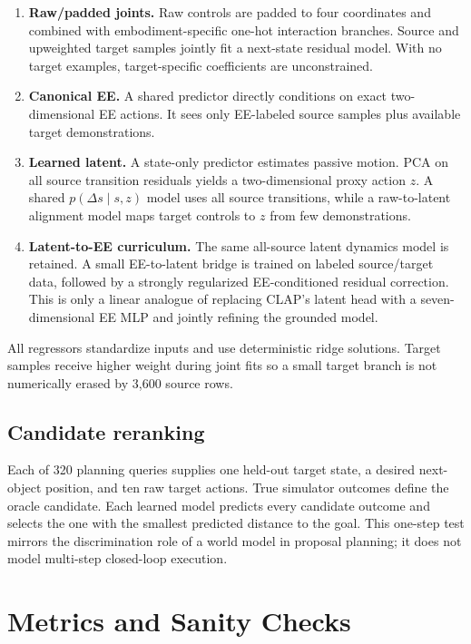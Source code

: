 \documentclass[11pt]{article}
\begin{document}
\begin{enumerate}[leftmargin=1.5em]
  \item \textbf{Raw/padded joints.} Raw controls are padded to four coordinates and combined with embodiment-specific one-hot interaction branches. Source and upweighted target samples jointly fit a next-state residual model. With no target examples, target-specific coefficients are unconstrained.
  \item \textbf{Canonical EE.} A shared predictor directly conditions on exact two-dimensional EE actions. It sees only EE-labeled source samples plus available target demonstrations.
  \item \textbf{Learned latent.} A state-only predictor estimates passive motion. PCA on all source transition residuals yields a two-dimensional proxy action $z$. A shared $p(\Delta s\mid s,z)$ model uses all source transitions, while a raw-to-latent alignment model maps target controls to $z$ from few demonstrations.
  \item \textbf{Latent-to-EE curriculum.} The same all-source latent dynamics model is retained. A small EE-to-latent bridge is trained on labeled source/target data, followed by a strongly regularized EE-conditioned residual correction. This is only a linear analogue of replacing CLAP's latent head with a seven-dimensional EE MLP and jointly refining the grounded model.
\end{enumerate}

All regressors standardize inputs and use deterministic ridge solutions. Target samples receive higher weight during joint fits so a small target branch is not numerically erased by 3,600 source rows.

\subsection{Candidate reranking}

Each of 320 planning queries supplies one held-out target state, a desired next-object position, and ten raw target actions. True simulator outcomes define the oracle candidate. Each learned model predicts every candidate outcome and selects the one with the smallest predicted distance to the goal. This one-step test mirrors the discrimination role of a world model in proposal planning; it does not model multi-step closed-loop execution.

\section{Metrics and Sanity Checks}
\end{document}
